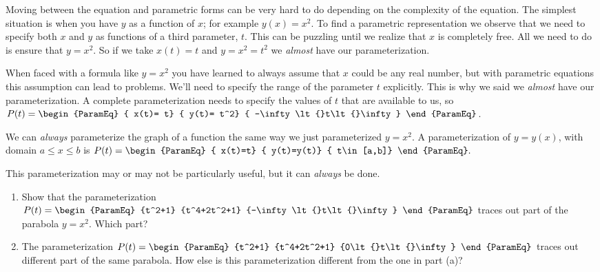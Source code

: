 \begin{myexample}
  Moving between the equation and parametric forms can be very hard to
  do depending on the complexity of the equation.  The simplest
  situation is when you have $y$ as a function of $x$; for example
  $y(x)=x^2$. To find a parametric representation we observe that we
  need to specify both $x$ and $y$ as functions of a third parameter,
  $t$. This can be puzzling until we realize that $x$ is completely
  free. All we need to do is ensure that $y=x^2$.  So if we take
  $x(t)=t$ and $y=x^2=t^2$ we \emph{almost} have our
  parameterization.
  
  When faced with a formula like $y=x^2$ you have learned to always
  assume that $x$ could be any real number, but with parametric equations this
  assumption can lead to problems. We'll need to specify the range of
  the parameter $t$ explicitly. This is why we said we \emph{almost}
  have our parameterization. A complete parameterization needs to
  specify the values of $t$ that are available to us, so
  $
P(t)=  \begin{ParamEq}
{    x(t)=  t}
{    y(t)=  t^2}
{    -\infty\lt{}t\lt{}\infty}
  \end{ParamEq}
  $.

  We can \emph{always} parameterize the graph of a function the same
  way we just parameterized $y=x^2$. A parameterization of $y=y(x)$,
  with domain $a\le x\le b$ is
$
P(t)=
\begin{ParamEq}
{  x(t)=t}
{  y(t)=y(t)}
{  t\in [a,b]}
\end{ParamEq}.
$

This parameterization may or may not be particularly useful, but
it can \emph{always} be done. 
\end{myexample}



\begin{embeddedproblem-enumerate}
    \begin{enumerate}[label={\bf{}(\alph*)}]
    \item Show that the parameterization
      $P(t)=
      \begin{ParamEq}
        {t^2+1}
        {t^4+2t^2+1}
        {-\infty\lt{}t\lt{}\infty}
      \end{ParamEq}
      $
      traces out part of the parabola $y=x^2$. Which part?
    \item The parameterization
      $P(t)=
      \begin{ParamEq}
        {t^2+1}
        {t^4+2t^2+1}
        {0\lt{}t\lt{}\infty}
      \end{ParamEq}
      $
      traces out  different part of the same parabola. How else is this
      parameterization different from the one in part (a)?
    \end{enumerate}
  \end{embeddedproblem-enumerate}

